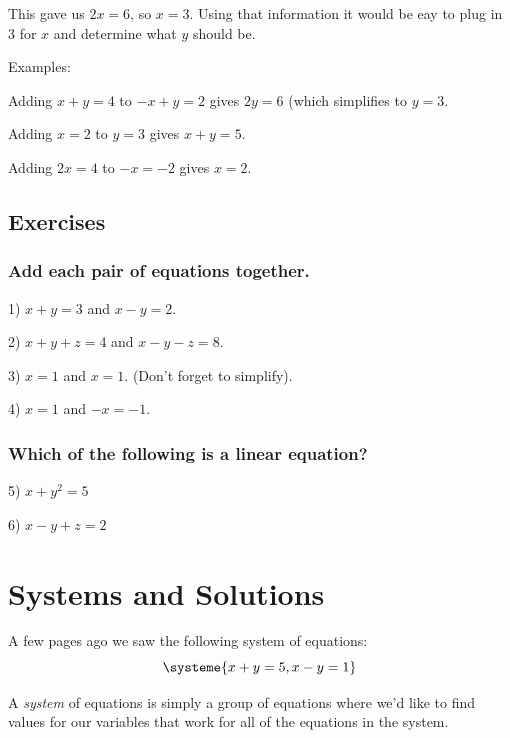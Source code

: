 \documentclass[a4paper,twoside,12pt]{memoir}  %
\begin{document}
This gave us $2x = 6$, so $x = 3$. Using that information it would be eay to plug in $3$ for $x$ and determine what $y$ should be.

Examples:
\begin{list}{}
\item Adding $x + y = 4$ to $-x + y = 2$ gives $2y = 6$ (which simplifies to $y=3$.
\item Adding $x = 2$ to $y=3$ gives $x + y = 5$.
\item Adding $2x = 4$ to $-x = -2$ gives $x = 2$.
\end{list}

\subsection{Exercises}
\subsubsection{Add each pair of equations together.}

\begin{list}{}
\item 1) $x + y = 3$ and $x - y = 2$.
\item 2) $x + y + z = 4$ and $x - y - z = 8$.
\item 3) $x = 1$ and $x = 1$. (Don't forget to simplify).
\item 4) $x = 1$ and $-x = -1$.
\end{list}

\subsubsection{Which of the following is a linear equation?}
\begin{list}{}
\item 5) $x + y^2 = 5$
\item 6) $x - y  + z= 2$
\end{list}

\section{Systems and Solutions}
A few pages ago we saw the following system of equations:
\begin{equation*}
  \systeme{
    x + y = 5,
    x - y = 1
    }
\end{equation*}

A \textit{system} of equations is simply a group of equations where we'd like to find values for our variables that work for all of the equations in the system.
\end{document}
